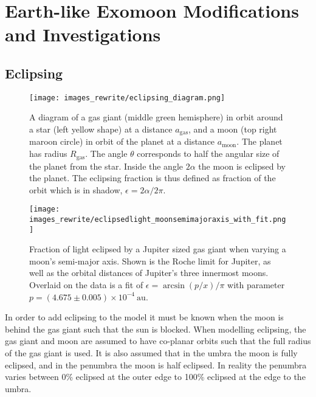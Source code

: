 \documentclass[12pt, onecolumn]{revtex4-2}    %
\begin{document}
\section{Earth-like Exomoon Modifications and Investigations} \label{sec:Exomoons}
%
\subsection{Eclipsing} \label{ssec:eclipsing}
%
\begin{figure}[t]
  \texttt{[image: images\_rewrite/eclipsing\_diagram.png]}
  \caption{
    A diagram of a gas giant (middle green hemisphere) in orbit around a star (left yellow shape) at a distance $a_{\text{gas}}$, and a moon (top right maroon circle) in orbit of the planet at a distance $a_{\text{moon}}$.
    The planet has radius $R_\text{gas}$.
    The angle $\theta$ corresponds to half the angular size of the planet from the star.
    Inside the angle $2\alpha$ the moon is eclipsed by the planet.
    The eclipsing fraction is thus defined as fraction of the orbit which is in shadow, $\epsilon = 2\alpha / 2\pi$.
  }
  \label{fig:quantitative_eclipsing}
\end{figure}

\begin{figure}[t]
  \texttt{[image: images\_rewrite/eclipsedlight\_moonsemimajoraxis\_with\_fit.png]}
  \caption{
    Fraction of light eclipsed by a Jupiter sized gas giant when varying a moon's semi-major axis.
    Shown is the Roche limit for Jupiter, as well as the orbital distances of Jupiter's three innermost moons.
    Overlaid on the data is a fit of $\epsilon = \arcsin(p/x)/\pi$ with parameter $p = (4.675\pm0.005)\times 10^{-4}\ \text{au}$.
  }
  \label{fig:quantitative_eclipsing_moon_semimajor_axis}
\end{figure}

In order to add eclipsing to the model it must be known when the moon is behind the gas giant such that the sun is blocked.
When modelling eclipsing, the gas giant and moon are assumed to have co-planar orbits such that the full radius of the gas giant is used.
It is also assumed that in the umbra the moon is fully eclipsed, and in the penumbra the moon is half eclipsed.
In reality the penumbra varies between 0\% eclipsed at the outer edge to 100\% eclipsed at the edge to the umbra.
\end{document}
